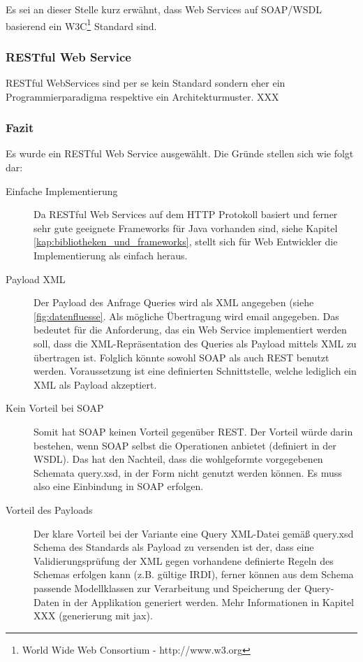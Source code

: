 Es sei an dieser Stelle kurz erwähnt, dass Web Services auf SOAP/WSDL basierend ein W3C\footnote{World Wide Web Consortium - http://www.w3.org} Standard sind. 

\subsubsection{RESTful Web Service}  
RESTful WebServices sind per se kein Standard sondern eher ein Programmierparadigma respektive ein Architekturmuster. 
XXX

\subsubsection{Fazit}
Es wurde ein RESTful Web Service ausgewählt. Die Gründe stellen sich wie folgt dar:

\begin{description}
\item[Einfache Implementierung] Da RESTful Web Services auf dem HTTP Protokoll basiert und ferner sehr gute geeignete Frameworks für Java vorhanden sind, siehe Kapitel \ref{kap:bibliotheken_und_frameworks}, stellt sich für Web Entwickler die Implementierung als einfach heraus.
\item[Payload XML] Der Payload des Anfrage Queries wird als XML angegeben (siehe \ref{fig:datenfluesse}. Als mögliche Übertragung wird email angegeben. Das bedeutet für die Anforderung, das ein Web Service  implementiert werden soll, dass die XML-Repräsentation des Queries als Payload mittels XML zu übertragen ist. Folglich könnte sowohl SOAP als auch REST benutzt werden. Voraussetzung ist eine definierten Schnittstelle, welche lediglich ein XML als Payload akzeptiert. 
\item[Kein Vorteil bei SOAP] Somit hat SOAP keinen Vorteil gegenüber REST. Der Vorteil würde darin bestehen, wenn SOAP selbst die Operationen anbietet (definiert in der WSDL). Das hat den Nachteil, dass die wohlgeformte vorgegebenen Schemata query.xsd, in der Form nicht genutzt werden können. Es muss also eine Einbindung in SOAP erfolgen. 
\item[Vorteil des Payloads] Der klare Vorteil bei der Variante eine Query XML-Datei gemäß query.xsd Schema des Standards als Payload zu versenden ist der, dass eine Validierungsprüfung der XML gegen vorhandene definierte Regeln des Schemas erfolgen kann (z.B. gültige IRDI), ferner können aus dem Schema passende Modellklassen zur Verarbeitung und Speicherung der Query-Daten in der Applikation generiert werden. Mehr Informationen in Kapitel XXX (generierung mit jax).  
\end{description}

